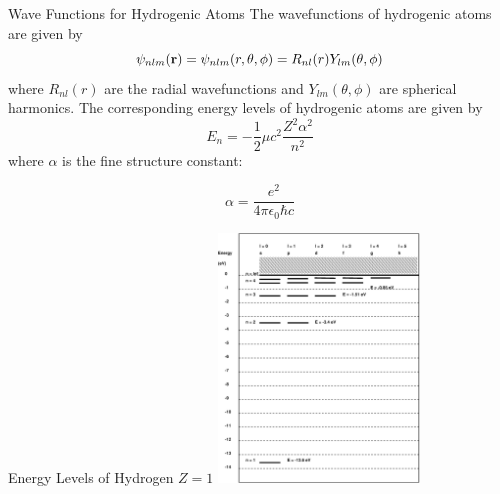 \documentclass[aspectratio=1610,xcolor=dvipsnames,t]{beamer}
\begin{document}
    \begin{frame}{Wave Functions for Hydrogenic Atoms} 
    The wavefunctions of hydrogenic atoms are given by
    \begin{equation}
        \psi_{nlm}({\bf r}) = \psi_{nlm}(r,\theta,\phi)
                           = R_{nl}(r) Y_{lm}(\theta, \phi)
    \end{equation}
    where $R_{nl}(r)$ are the radial wavefunctions and $Y_{lm}(\theta, \phi)$ are
    spherical harmonics. The corresponding energy levels of hydrogenic atoms are
    given by
    \begin{equation}
        E_n = - \frac{1}{2} \mu c^2 \frac{Z^2 \alpha^2}{n^2}
    \end{equation}
    where $\alpha$ is the fine structure constant: 

    $$ \alpha = \frac{e^2}{4 \pi \epsilon_0 \hbar c} $$

    \end{frame} 

    

    \begin{frame}{Energy Levels of Hydrogen $Z=1$} 
        \centering
        \includegraphics[width=0.4\textwidth]{levels.eps}
    \end{frame} 
\end{document}
